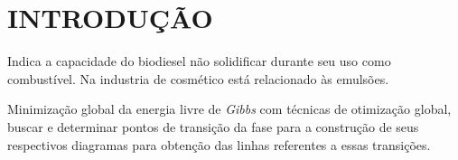 
\chapter{INTRODUÇÃO}
\label{chap:introducao}

Indica a capacidade do biodiesel não solidificar durante seu uso como combustível. Na industria de cosmético está relacionado às emulsões. \cite{Leggieri2018a}

\cite{Carvalho2001}

\cite{Barbosa2004}

Minimização global da energia livre de \textit{Gibbs} com técnicas de otimização global, buscar e determinar pontos de transição da fase para a construção de seus respectivos diagramas para obtenção das linhas referentes a essas transições. \cite{Muller2019}

\cite{PakdelAmirSaeid2021CNCN}

